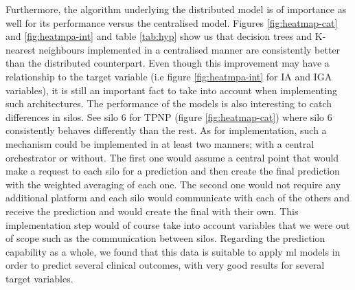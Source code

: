 Furthermore, the algorithm underlying the distributed model is of importance as well for its performance versus the centralised model. Figures \ref{fig:heatmap-cat} and \ref{fig:heatmpa-int} and table \ref{tab:hyp} show us that decision trees and K-nearest neighbours implemented in a centralised manner are consistently better than the distributed counterpart. Even though this improvement may have a relationship to the target variable (i.e figure \ref{fig:heatmpa-int} for IA and IGA variables), it is still an important fact to take into account when implementing such architectures. The performance of the models is also interesting to catch differences in silos. See silo 6 for TPNP (figure \ref{fig:heatmap-cat}) where silo 6 consistently behaves differently than the rest.
As for implementation, such a mechanism could be implemented in at least two manners; with a central orchestrator or without. The first one would assume a central point that would make a request to each silo for a prediction and then create the final prediction with the weighted averaging of each one. The second one would not require any additional platform and each silo would communicate with each of the others and receive the prediction and would create the final with their own. This implementation step would of course take into account variables that we were out of scope such as the communication between silos. 
Regarding the prediction capability as a whole, we found that this data is suitable to apply \ac{ml} models in order to predict several clinical outcomes, with very good results for several target variables. 

